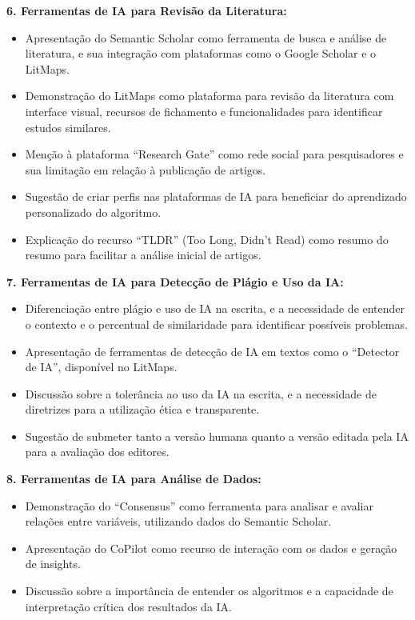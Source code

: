 \documentclass[
  a4paper,
]{article}
\providecommand{\tightlist}{%
  \setlength{\itemsep}{0pt}\setlength{\parskip}{0pt}}\usepackage{longtable,booktabs,array}
\begin{document}
\begin{tcolorbox}
\textbf{6. Ferramentas de IA para Revisão da Literatura:}

\begin{itemize}
\tightlist
\item
  Apresentação do Semantic Scholar como ferramenta de busca e análise de
  literatura, e sua integração com plataformas como o Google Scholar e o
  LitMaps.
\item
  Demonstração do LitMaps como plataforma para revisão da literatura com
  interface visual, recursos de fichamento e funcionalidades para
  identificar estudos similares.
\item
  Menção à plataforma ``Research Gate'' como rede social para
  pesquisadores e sua limitação em relação à publicação de artigos.
\item
  Sugestão de criar perfis nas plataformas de IA para beneficiar do
  aprendizado personalizado do algoritmo.
\item
  Explicação do recurso ``TLDR'' (Too Long, Didn't Read) como resumo do
  resumo para facilitar a análise inicial de artigos.
\end{itemize}

\textbf{7. Ferramentas de IA para Detecção de Plágio e Uso da IA:}

\begin{itemize}
\tightlist
\item
  Diferenciação entre plágio e uso de IA na escrita, e a necessidade de
  entender o contexto e o percentual de similaridade para identificar
  possíveis problemas.
\item
  Apresentação de ferramentas de detecção de IA em textos como o
  ``Detector de IA'', disponível no LitMaps.
\item
  Discussão sobre a tolerância ao uso da IA na escrita, e a necessidade
  de diretrizes para a utilização ética e transparente.
\item
  Sugestão de submeter tanto a versão humana quanto a versão editada
  pela IA para a avaliação dos editores.
\end{itemize}

\textbf{8. Ferramentas de IA para Análise de Dados:}

\begin{itemize}
\tightlist
\item
  Demonstração do ``Consensus'' como ferramenta para analisar e avaliar
  relações entre variáveis, utilizando dados do Semantic Scholar.
\item
  Apresentação do CoPilot como recurso de interação com os dados e
  geração de insights.
\item
  Discussão sobre a importância de entender os algoritmos e a capacidade
  de interpretação crítica dos resultados da IA.
\end{itemize}


\end{tcolorbox}
\end{document}
